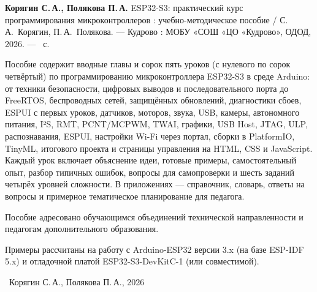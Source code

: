 \begin{titlepage}
\newpage
\thispagestyle{empty}
\vspace*{\fill}
\begin{minipage}{\textwidth}\small\rmfamily\raggedright
\textbf{Корягин С.\,А., Полякова П.\,А.} ESP32-S3: практический курс программирования микроконтроллеров :
учебно-методическое пособие / С.\,А.~Корягин, П.\,А.~Полякова. --- Кудрово : МОБУ «СОШ «ЦО «Кудрово», ОДОД, 2026. ---
\pageref{LastPage}~с.

\vspace{4mm}
Пособие содержит вводные главы и сорок пять уроков (с нулевого по сорок четвёртый) по программированию
микроконтроллера ESP32-S3 в среде Arduino: от техники безопасности, цифровых выводов и
последовательного порта до FreeRTOS, беспроводных сетей, защищённых обновлений, диагностики сбоев,
ESPUI с первых уроков, датчиков, моторов, звука, USB, камеры, автономного питания, I²S, RMT, PCNT/MCPWM, TWAI, графики, USB Host, JTAG, ULP, распознавания, ESPUI, настройки Wi-Fi через портал, сборки в PlatformIO, TinyML, итогового проекта и страницы управления на HTML, CSS и JavaScript. Каждый урок включает
объяснение идеи, готовые примеры, самостоятельный опыт, разбор типичных ошибок, вопросы для
самопроверки и шесть заданий четырёх уровней сложности. В приложениях --- справочник, словарь, ответы на вопросы
и примерное тематическое планирование для педагога.

Пособие адресовано обучающимся объединений технической направленности и педагогам
дополнительного образования.

\vspace{4mm}
Примеры рассчитаны на работу с Arduino-ESP32 версии 3.x (на базе ESP-IDF 5.x) и отладочной платой
ESP32-S3-DevKitC-1 (или совместимой).

\vspace{6mm}
\textcopyright~Корягин С.\,А., Полякова П.\,А., 2026
\end{minipage}
\end{titlepage}
